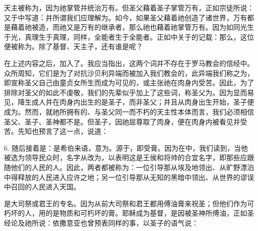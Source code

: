 天主被称为，因为祂掌管并统治万有。但圣父藉着圣子掌管万有，正如宗徒所说：又于中写道：并所谓我们应理解为。如今，如果圣父藉着祂创造了诸世界，万有都是藉着祂被造，而祂又是万有的继承者，那么祂也藉着祂掌管万有。因为如同光生于光，真理生于真理，同样，全能者生于全能者。正如中关于的记载：那么，这位便被称为。除了基督、天主子，还有谁是呢？\par

在上述内容之后，加入了。我应当指出，这两个词并不存在于罗马教会的信经中。众所周知，它们是为了对抗沙贝利异端而被加入我们教会的，此异端我们称之为，即宣称圣父自己由童贞女所生而成为可见的，或主张祂在肉身内受苦。因此，为了排除对圣父的如此不虔敬，我们的先辈似乎加上了这些词，称圣父为。因为显而易见，降生成人并在肉身内出生的是圣子，而非圣父；并且从肉身出生开始，圣子便成为。然而，就祂所拥有的、与圣父同一而不朽的天主性本体而言，我们必须相信圣父、圣子、圣神都不是。但圣子，因祂屈尊取了肉身，便在肉身内被看见并受苦。先知也预言了这一点，说道：\par

6. 随后接着是：是希伯来语，意为。源于，即受膏。因为在中，我们读到，当他被选为领导民众时，名字从改为，以表明这是王侯和将帅的合宜名字，即那些应跟随他们的人民的人。因此，两者都被称为：一位引导那从埃及地领出、从旷野漂泊中得释放的人民进入应许之地；另一位引导那从无知的黑暗中领出、从世界的谬误中召回的人民进入天国。\par

是大司祭或君王的专名。因为从前大司祭和君王都用傅油膏来祝圣；但他们作为可朽坏的人，用的是物质和可朽坏的膏。耶稣成为基督，是因被圣神所傅油，正如圣经论及祂所说：依撒意亚也曾预表同样的事，以圣子的语气说：\par

